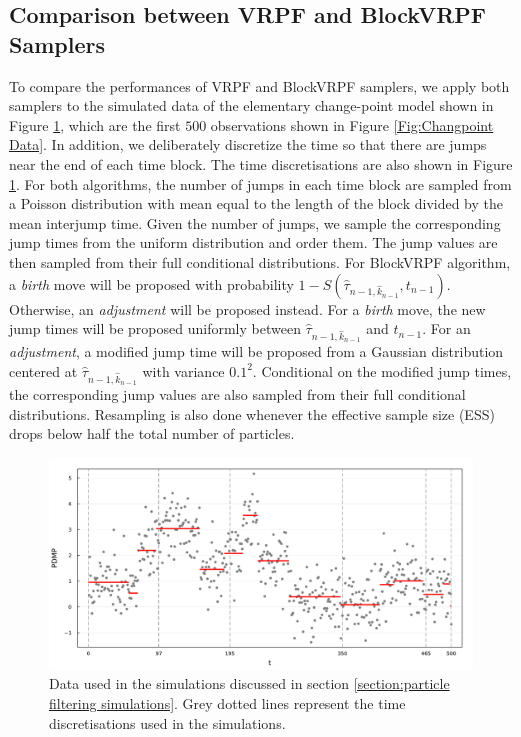 \documentclass[12pt,a4paper]{article}
\begin{document}
\subsection{Comparison between VRPF and BlockVRPF Samplers}\label{section: PF simulation}
To compare the performances of VRPF and BlockVRPF samplers, we apply both samplers to the simulated data of the elementary change-point model shown in Figure \ref{fig: PF_Simulation_Data}, which are the first \(500\) observations shown in Figure \ref{Fig:Changpoint Data}. In addition, we deliberately discretize the time so that there are jumps near the end of each time block. The time discretisations are also shown in Figure \ref{fig: PF_Simulation_Data}. For both algorithms, the number of jumps in each time block are sampled from a Poisson distribution with mean equal to the length of the block divided by the mean interjump time. Given the number of jumps, we sample the corresponding jump times from the uniform distribution and order them. The jump values are then sampled from their full conditional distributions. For BlockVRPF algorithm, a \textit{birth} move will be proposed with probability \(1-S(\hat{\tau}_{n-1,\hat{k}_{n-1}},t_{n-1})\). Otherwise, an \textit{adjustment} will be proposed instead. For a \textit{birth} move, the new jump times will be proposed uniformly between \(\hat{\tau}_{n-1,\hat{k}_{n-1}}\) and \(t_{n-1}\). For an \textit{adjustment}, a modified jump time will be proposed from a Gaussian distribution centered at \(\hat{\tau}_{n-1,\hat{k}_{n-1}}\) with variance \(0.1^2\). Conditional on the modified jump times, the corresponding jump values are also sampled from their full conditional distributions. Resampling is also done whenever the effective sample size (ESS) drops below half the total number of particles. 
\begin{figure}
    \centering
    \includegraphics[width=\textwidth]{PF_Simulation_Data.pdf}
    \caption{Data used in the simulations discussed in section \ref{section:particle filtering simulations}. Grey dotted lines represent the time discretisations used in the simulations.}
    \label{fig: PF_Simulation_Data}
\end{figure}
\end{document}
